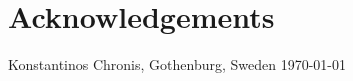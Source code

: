 \newpage
\clearpage
\mbox{}
\newpage
\clearpage
\thispagestyle{empty}
\section*{Acknowledgements}

\hfill Konstantinos Chronis, Gothenburg, Sweden \today
\newpage
\clearpage
\mbox{}
